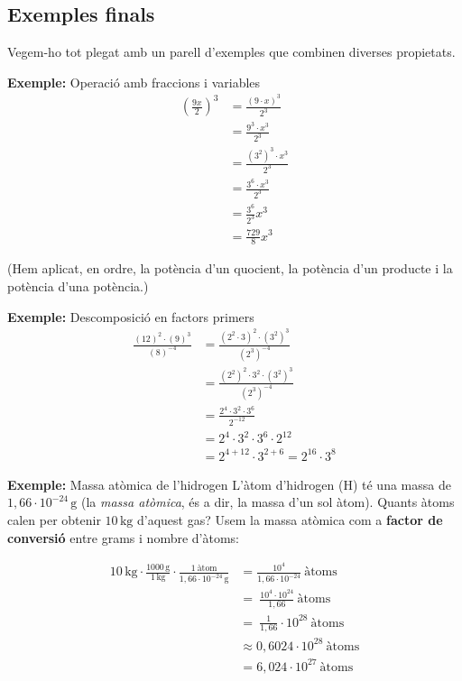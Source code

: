 \subsection{Exemples finals}

Vegem-ho tot plegat amb un parell d'exemples que combinen diverses propietats.

\begin{exemple}{\textbf{Exemple:} Operació amb fraccions i variables}
\[
\begin{aligned}
\left(\frac{9x}{2}\right)^3 &= \frac{(9 \cdot x)^3}{2^3} \\
&= \frac{9^3 \cdot x^3}{2^3} \\
&= \frac{\left(3^2\right)^3 \cdot x^3}{2^3} \\
&= \frac{3^6 \cdot x^3}{2^3} \\
&= \frac{3^6}{2^3}x^3 \\
&= \frac{729}{8} x^3
\end{aligned}
\]

(Hem aplicat, en ordre, la potència d'un quocient, la potència d'un producte i la potència d'una potència.)
\end{exemple}

\begin{exemple}{\textbf{Exemple:} Descomposició en factors primers}
\[
\begin{aligned}
\frac{(12)^2 \cdot (9)^3}{(8)^{-4}} &= \frac{\left(2^2 \cdot 3\right)^2 \cdot \left(3^2\right)^3}{\left(2^3\right)^{-4}} \\
&= \frac{\left(2^2\right)^2\cdot 3^2 \cdot \left(3^2\right)^3}{\left(2^3\right)^{-4}} \\
&= \frac{2^4 \cdot 3^2 \cdot 3^6}{2^{-12}} \\
&= 2^4 \cdot 3^2 \cdot 3^6 \cdot 2^{12} \\
&= 2^{4+12} \cdot 3^{2+6} = 2^{16} \cdot 3^{8}
\end{aligned}
\]
\end{exemple}

\begin{exemple}{\textbf{Exemple:} Massa atòmica de l'hidrogen}
L'àtom d'hidrogen (H) té una massa de $1{,}66\cdot10^{-24}\,\text{g}$ (la \emph{massa atòmica}, és a dir, la massa d'un sol àtom). Quants àtoms calen per obtenir $10\,\text{kg}$ d'aquest gas? Usem la massa atòmica com a \textbf{factor de conversió} entre grams i nombre d'àtoms:

\[
\begin{aligned}
10\,\text{kg}\cdot\frac{1000\,\text{g}}{1\,\text{kg}}\cdot\frac{1\ \text{àtom}}{1{,}66\cdot10^{-24}\,\text{g}}
&= \frac{10^{4}}{1{,}66\cdot10^{-24}}\ \text{àtoms} \\
&=\ \frac{10^{4}\cdot10^{24}}{1{,}66}\ \text{àtoms} \\
&=\ \frac{1}{1{,}66}\cdot10^{28}\ \text{àtoms} \\
&\approx 0{,}6024\cdot10^{28}\ \text{àtoms} \\
&= \boxed{6{,}024\cdot10^{27}\ \text{àtoms}}
\end{aligned}
\]
\end{exemple}

